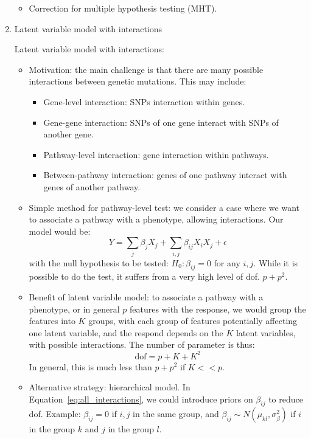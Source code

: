 \documentclass[11pt]{article}
\begin{document}
\begin{enumerate}
\begin{itemize}
\item Correction for multiple hypothesis testing (MHT). 
\end{itemize}

\item{Latent variable model with interactions}

Latent variable model with interactions: 
\begin{itemize}
\item Motivation: the main challenge is that there are many possible interactions between genetic mutations. This may include: 
\begin{itemize}
	\item Gene-level interaction: SNPs interaction within genes. 
	\item Gene-gene interaction: SNPs of one gene interact with SNPs of another gene. 
	\item Pathway-level interaction: gene interaction within pathways.
	\item Between-pathway interaction: genes of one pathway interact with genes of another pathway. 
\end{itemize}

\item Simple method for pathway-level test: we consider a case where we want to associate a pathway with a phenotype, allowing interactions. Our model would be: 
\begin{equation}
Y = \sum_j \beta_j X_j + \sum_{i,j} \beta_{ij} X_i X_j + \epsilon	
\label{eq:all_interactions}
\end{equation}
with the null hypothesis to be tested: $H_0: \beta_{ij} = 0$ for any $i,j$. While it is possible to do the test, it suffers from a very high level of dof. $p + p^2$. 

\item Benefit of latent variable model: to associate a pathway with a phenotype, or in general $p$ features with the response, we would group the features into $K$ groups, with each group of features potentially affecting one latent variable, and the respond depends on the $K$ latent variables, with possible interactions. The number of parameter is thus: 
\begin{equation}
\text{dof} = p + K + K^2 	
\end{equation}
In general, this is much less than $p + p^2$ if $K << p$.

\item Alternative strategy: hierarchical model. In Equation~\ref{eq:all_interactions}, we could introduce priors on $\beta_{ij}$ to reduce dof. Example: $\beta_{ij} = 0$ if $i,j$ in the same group, and $\beta_{ij} \sim N(\mu_{kl}, \sigma_{\beta}^2)$ if $i$ in the group $k$ and $j$ in the group $l$. 


\end{itemize}
\end{enumerate}
\end{document}
